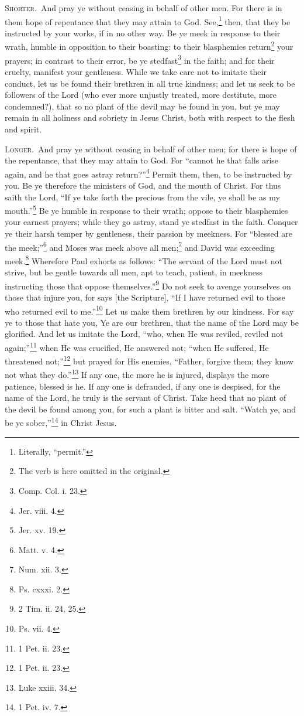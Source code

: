 
\textsc{Shorter.}~And pray ye without ceasing in behalf of other men. For there is in them hope of repentance that they  may attain to God. See,\footnote{Literally, “permit.”} then, that they be instructed by your works, if in no other way. Be ye meek in response to their wrath, humble in opposition to their boasting: to their blasphemies return\footnote{The verb is here omitted in the original.} your prayers; in contrast to their error, be ye stedfast\footnote{Comp. Col. i. 23.} in the faith; and for their cruelty, manifest your gentleness. While we take care not to imitate their conduct, let us be found their brethren in all true kindness; and let us seek to be followers of the Lord (who ever more unjustly treated, more destitute, more condemned?), that so no plant of the devil may be found in you, but ye may remain in all holiness and sobriety in Jesus Christ, both with respect to the flesh and spirit.

\textsc{Longer.}~And pray ye without ceasing in behalf of other men; for there is hope of the repentance, that they may attain to God. For “cannot he that falls arise again, and he that goes astray return?”\footnote{Jer. viii. 4.} Permit them, then, to be instructed by you. Be ye therefore the ministers of God, and the mouth of Christ. For thus saith the Lord, “If ye take forth the precious from the vile, ye shall be as my mouth.”\footnote{Jer. xv. 19.} Be ye humble in response to their wrath; oppose to their blasphemies your earnest prayers; while they go astray, stand ye stedfast in the faith. Conquer ye their harsh temper by gentleness, their passion by meekness. For “blessed are the meek;”\footnote{Matt. v. 4.} and Moses was meek above all men;\footnote{Num. xii. 3.} and David was exceeding meek.\footnote{Ps. cxxxi. 2.} Wherefore Paul exhorts as follows: “The servant of the Lord must not strive, but be gentle towards all men, apt to teach, patient, in meekness instructing those that oppose themselves.”\footnote{2 Tim. ii. 24, 25.} Do not seek to avenge yourselves on those that injure you, for says [the Scripture], “If I have returned evil to those who returned evil to me.”\footnote{Ps. vii. 4.} Let us make them brethren by our kindness. For say ye to those that hate you, Ye are our brethren, that the name of the Lord may be glorified. And let us imitate the Lord, “who, when He was reviled, reviled not again;”\footnote{1 Pet. ii. 23.} when He was crucified, He answered not; “when He suffered, He threatened not;”\footnote{1 Pet. ii. 23.} but prayed for His enemies, “Father, forgive them; they know not what they do.”\footnote{Luke xxiii. 34.} If any one, the more he is injured, displays the more patience, blessed is he. If any one is defrauded, if any one is despised, for the name of the Lord, he truly is the servant of Christ. Take heed that no plant of the devil be found among you, for such a plant is bitter and salt. “Watch ye, and be ye sober,”\footnote{1 Pet. iv. 7.} in Christ Jesus.

